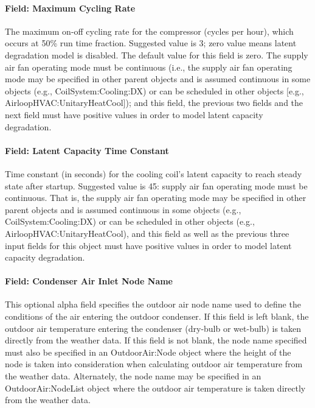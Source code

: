 \paragraph{Field: Maximum Cycling Rate}\label{field-maximum-cycling-rate}

The maximum on-off cycling rate for the compressor (cycles per hour), which occurs at 50\% run time fraction. Suggested value is 3; zero value means latent degradation model is disabled. The default value for this field is zero. The supply air fan operating mode must be continuous (i.e., the supply air fan operating mode may be specified in other parent objects and is assumed continuous in some objects (e.g., CoilSystem:Cooling:DX) or can be scheduled in other objects {[}e.g., AirloopHVAC:UnitaryHeatCool{]}); and this field, the previous two fields and the next field must have positive values in order to model latent capacity degradation.

\paragraph{Field: Latent Capacity Time Constant}\label{field-latent-capacity-time-constant}

Time constant (in seconds) for the cooling coil's latent capacity to reach steady state after startup. Suggested value is 45: supply air fan operating mode must be continuous. That is, the supply air fan operating mode may be specified in other parent objects and is assumed continuous in some objects (e.g., CoilSystem:Cooling:DX) or can be scheduled in other objects (e.g., AirloopHVAC:UnitaryHeatCool), and this field as well as the previous three input fields for this object must have positive values in order to model latent capacity degradation.

\paragraph{Field: Condenser Air Inlet Node Name}\label{field-condenser-air-inlet-node-name}

This optional alpha field specifies the outdoor air node name used to define the conditions of the air entering the outdoor condenser. If this field is left blank, the outdoor air temperature entering the condenser (dry-bulb or wet-bulb) is taken directly from the weather data. If this field is not blank, the node name specified must also be specified in an OutdoorAir:Node object where the height of the node is taken into consideration when calculating outdoor air temperature from the weather data. Alternately, the node name may be specified in an OutdoorAir:NodeList object where the outdoor air temperature is taken directly from the weather data.

